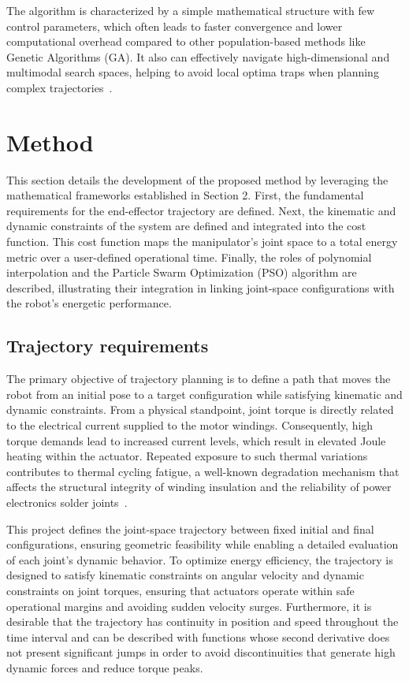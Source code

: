 \documentclass[runningheads]{llncs}
\begin{document}
The algorithm is characterized by a simple mathematical structure with few control parameters, which often leads to faster convergence and lower computational overhead compared to other population-based methods like Genetic Algorithms (GA). It also can effectively navigate high-dimensional and multimodal search spaces, helping to avoid local optima traps when planning complex trajectories~\cite{ref_pso_adv}.

\section{Method}
This section details the development of the proposed method by leveraging the mathematical frameworks established in Section 2. First, the fundamental requirements for the end-effector trajectory are defined. Next, the kinematic and dynamic constraints of the system are defined and integrated into the cost function. This cost function maps the manipulator's joint space to a total energy metric over a user-defined operational time. Finally, the roles of polynomial interpolation and the Particle Swarm Optimization (PSO) algorithm are described, illustrating their integration in linking joint-space configurations with the robot's energetic performance.

\subsection{Trajectory requirements} 
The primary objective of trajectory planning is to define a path that moves the robot from an initial pose to a target configuration while satisfying kinematic and dynamic constraints. From a physical standpoint, joint torque is directly related to the electrical current supplied to the motor windings. Consequently, high torque demands lead to increased current levels, which result in elevated Joule heating within the actuator. Repeated exposure to such thermal variations contributes to thermal cycling fatigue, a well-known degradation mechanism that affects the structural integrity of winding insulation and the reliability of power electronics solder joints~\cite{ref_peakcurrent}.

This project defines the joint-space trajectory between fixed initial and final configurations, ensuring geometric feasibility while enabling a detailed evaluation of each joint's dynamic behavior. To optimize energy efficiency, the trajectory is designed to satisfy kinematic constraints on angular velocity and dynamic constraints on joint torques, ensuring that actuators operate within safe operational margins and avoiding sudden velocity surges. Furthermore, it is desirable that the trajectory has continuity in position and speed throughout the time interval and can be described with functions whose second derivative does not present significant jumps in order to avoid discontinuities that generate high dynamic forces and reduce torque peaks.
\end{document}
